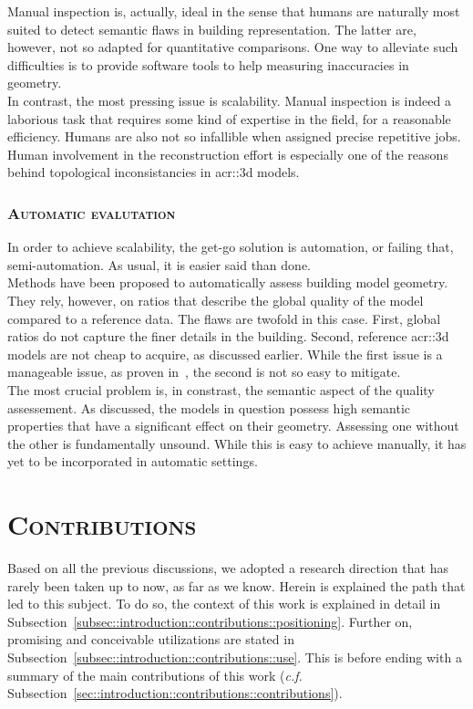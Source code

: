             Manual inspection is, actually, ideal in the sense that humans are naturally most suited to detect semantic flaws in building representation.
            The latter are, however, not so adapted for quantitative comparisons.
            One way to alleviate such difficulties is to provide software tools to help measuring inaccuracies in geometry\addref.\\

            In contrast, the most pressing issue is scalability.
            Manual inspection is indeed a laborious task that requires some kind of expertise in the field, for a reasonable efficiency.
            Humans are also not so infallible when assigned precise repetitive jobs.
            Human involvement in the reconstruction effort is especially one of the reasons behind topological inconsistancies in \gls{acr::3d} models.

        \subsubsection{\textsc{Automatic evalutation}}
            In order to achieve scalability, the get-go solution is automation, or failing that, semi-automation.
            As usual, it is easier said than done.\\

            Methods have been proposed to automatically assess building model geometry.
            They rely, however, on ratios that describe the global quality of the model compared to a reference data.
            The flaws are twofold in this case.
            First, global ratios do not capture the finer details in the building.
            Second, reference \gls{acr::3d} models are not cheap to acquire, as discussed earlier.
            While the first issue is a manageable issue, as proven in~\textcite{rottensteiner2012isprs}, the second is not so easy to mitigate.\\

            The most crucial problem is, in constrast, the semantic aspect of the quality assessement.
            As discussed, the models in question possess high semantic properties that have a significant effect on their geometry.
            Assessing one without the other is fundamentally unsound.
            While this is easy to achieve manually, it has yet to be incorporated in automatic settings.
\section{\textsc{Contributions}}
    \label{sec::introduction::contributions}
    Based on all the previous discussions, we adopted a research direction that has rarely been taken up to now, as far as we know.
    Herein is explained the path that led to this subject.
    To do so, the context of this work is explained in detail in Subsection~\ref{subsec::introduction::contributions::positioning}.
    Further on, promising and conceivable utilizations are stated in Subsection~\ref{subsec::introduction::contributions::use}.
    This is before ending with a summary of the main contributions of this work (\textit{c.f.} Subsection~\ref{sec::introduction::contributions::contributions}).
    
